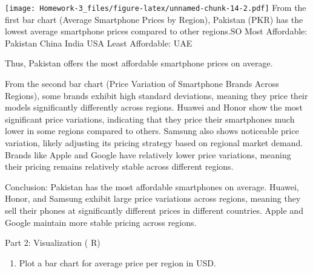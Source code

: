 \documentclass[
]{article}
\providecommand{\tightlist}{%
  \setlength{\itemsep}{0pt}\setlength{\parskip}{0pt}}
\begin{document}
\texttt{[image: Homework-3\_files/figure-latex/unnamed-chunk-14-2.pdf]}
From the first bar chart (Average Smartphone Prices by Region), Pakistan
(PKR) has the lowest average smartphone prices compared to other
regions.SO Most Affordable: Pakistan China India USA Least Affordable:
UAE

Thus, Pakistan offers the most affordable smartphone prices on average.

From the second bar chart (Price Variation of Smartphone Brands Across
Regions), some brands exhibit high standard deviations, meaning they
price their models significantly differently across regions. Huawei and
Honor show the most significant price variations, indicating that they
price their smartphones much lower in some regions compared to others.
Samsung also shows noticeable price variation, likely adjusting its
pricing strategy based on regional market demand. Brands like Apple and
Google have relatively lower price variations, meaning their pricing
remains relatively stable across different regions.

Conclusion: Pakistan has the most affordable smartphones on average.
Huawei, Honor, and Samsung exhibit large price variations across
regions, meaning they sell their phones at significantly different
prices in different countries. Apple and Google maintain more stable
pricing across regions.

Part 2: Visualization ( R)

\begin{enumerate}
\def\labelenumi{\arabic{enumi}.}
\tightlist
\item
  Plot a bar chart for average price per region in USD.
\end{enumerate}
\end{document}
